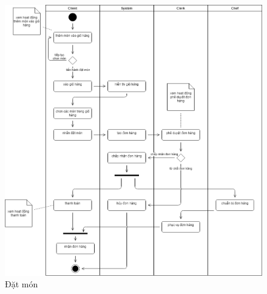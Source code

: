 \begin{figure}[!h]
    \begin{center}
        \includegraphics[scale=0.4]{Images/ActivityDiagram/order.png}
    \end{center}
    \hspace{0.3cm}
    \caption{Đặt món}
\end{figure}

\newpage

